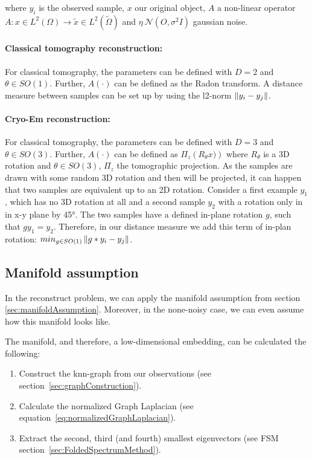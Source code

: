 where $y_i$ is the observed sample, $x$ our original object, $A$ a non-linear operator 
$A: x \in L^2(\Omega) \rightarrow \tilde{x} \in L^2(\tilde{\Omega})$ and $\eta ~ \mathcal{N}(O, \sigma^2 I)$ gaussian noise.

\paragraph{Classical tomography reconstruction:}

For classical tomography, the parameters can be defined with $D=2$ and $\theta \in SO(1)$.
Further, $A(\cdot)$ can be defined as the Radon transform. 
A distance measure between samples can be set up by using the l2-norm $\left\lVert y_i - y_j\right\rVert$.

\paragraph{Cryo-Em reconstruction:}
For classical tomography, the parameters can be defined with $D=3$ and $\theta \in SO(3)$.
Further, $A(\cdot)$ can be defined as $\Pi_z \left( R_{\theta} x) \right)$ 
where $R_{\theta}$ is a 3D rotation and $\theta \in SO(3)$, $\Pi_z$ the tomographic projection.
As the samples are drawn with some random 3D rotation and then will be projected, it can 
happen that two samples are equivalent up to an 2D rotation. 
Consider a first example $y_1$, which has no 3D rotation at all and 
a second sample $y_2$ with a rotation only in in x-y plane by 45°.
The two samples have a defined in-plane rotation $g$, such that $g y_1 = y_2$.
Therefore, in our distance measure we add this term of in-plan rotation: $min_{g \in SO(1)}\left\lVert g * y_i - y_j\right\rVert$. 


\subsection{Manifold assumption}
In the reconstruct problem, we can apply the manifold assumption from section \ref{sec:manifoldAssumption}.
Moreover, in the none-noisy case, we can even assume how this manifold looks like.

The manifold, and therefore, a low-dimensional embedding, can be calculated the following:

\begin{enumerate}
    \item Construct the knn-graph from our observations (see section~\ref{sec:graphConstruction}).
    \item Calculate the normalized Graph Laplacian (see equation~\ref{eq:normalizedGraphLaplacian}).
    \item Extract the second, third (and fourth) smallest eigenvectors (see FSM section~\ref{sec:FoldedSpectrumMethod}).
\end{enumerate}

